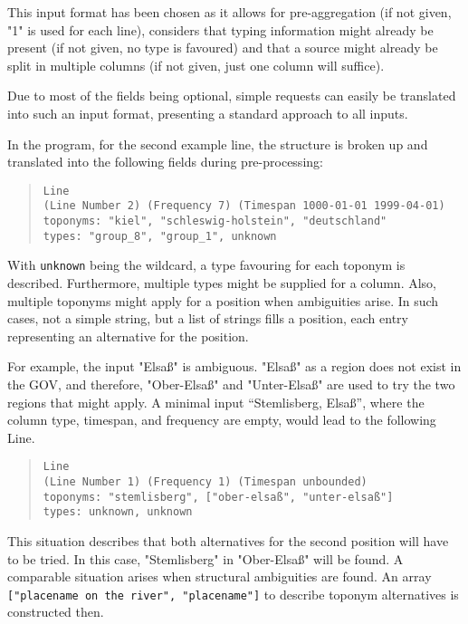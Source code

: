 \documentclass[11pt]{article}
\begin{document}
This input format has been chosen as it allows for pre-aggregation (if not given, "1" is used for each line), considers that typing information might already be present (if not given, no type is favoured) and that a source might already be split in multiple columns (if not given, just one column will suffice).

Due to most of the fields being optional, simple requests can easily be translated into such an input format, presenting a standard approach to all inputs.

In the program, for the second example line, the structure is broken up and translated into the following fields during pre-processing:

\begin{quote}
\texttt{Line}\\
\texttt{(Line Number 2) (Frequency 7) (Timespan 1000-01-01 1999-04-01)}\\
\texttt{toponyms: "kiel", "schleswig-holstein", "deutschland"}\\
\texttt{types: "group\_8", "group\_1", unknown}
\end{quote}

With \texttt{unknown} being the wildcard, a type favouring for each toponym is described. Furthermore, multiple types might be supplied for a column. Also, multiple toponyms might apply for a position when ambiguities arise. In such cases, not a simple string, but a list of strings fills a position, each entry representing an alternative for the position.

For example, the input "Elsaß" is ambiguous. "Elsaß" as a region does not exist in the GOV, and therefore, "Ober-Elsaß" and "Unter-Elsaß" are used to try the two regions that might apply. A minimal input ``Stemlisberg, Elsaß'', where the column type, timespan, and frequency are empty, would lead to the following Line.

\begin{quote}
\texttt{Line}\\
\texttt{(Line Number 1) (Frequency 1) (Timespan unbounded)}\\
\texttt{toponyms: "stemlisberg", ["ober-elsaß", "unter-elsaß"]}\\
\texttt{types: unknown, unknown}
\end{quote}

This situation describes that both alternatives for the second position will have to be tried. In this case, "Stemlisberg" in "Ober-Elsaß" will be found. A comparable situation arises when structural ambiguities are found. An array \texttt{["placename on the river", "placename"]} to describe toponym alternatives is constructed then.
\end{document}
